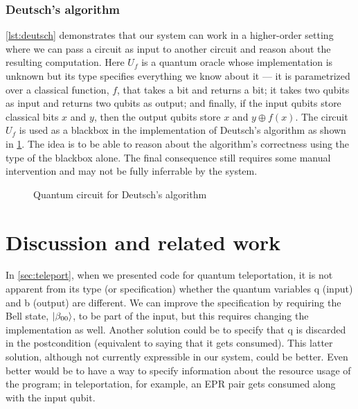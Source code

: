 \documentclass[adraft,creativecommons]{eptcs}
\theoremstyle{definition}
\theoremstyle{remark}
\begin{document}
\subsubsection{Deutsch's algorithm}
\cref{lst:deutsch} demonstrates that our system can work in a higher-order setting where we can pass a circuit as input to another circuit and reason about the resulting computation. Here $U_f$ is a quantum oracle whose implementation is unknown but its type specifies everything we know about it --- it is parametrized over a classical function, $f$, that takes a bit and returns a bit; it takes two qubits as input and returns two qubits as output; and finally, if the input qubits store classical bits $x$ and $y$, then the output qubits store $x$ and $y \oplus f(x)$. The circuit $U_f$ is used as a blackbox in the implementation of Deutsch's algorithm as shown in \cref{fig:deutsch}. The idea is to be able to reason about the algorithm's correctness using the type of the blackbox alone. The final consequence still requires some manual intervention and may not be fully inferrable by the system.

\begin{figure}
    \centering
    \caption{Quantum circuit for Deutsch's algorithm}
    \label{fig:deutsch}
\end{figure}



\section{Discussion and related work}

In \cref{sec:teleport}, when we presented code for quantum teleportation, it is not apparent from its type (or specification) whether the quantum variables q (input) and b (output) are different. We can improve the specification by requiring the Bell state, $\ket{\beta_{00}}$, to be part of the input, but this requires changing the implementation as well. Another solution could be to specify that q is discarded in the postcondition (equivalent to saying that it gets consumed). This latter solution, although not currently expressible in our system, could be better. Even better would be to have a way to specify information about the resource usage of the program; in teleportation, for example, an EPR pair gets consumed along with the input qubit.
\end{document}
